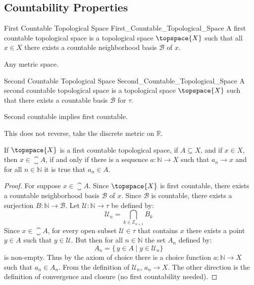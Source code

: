 \subsection{Countability Properties}
    \begin{fdefinition}{First Countable Topological Space}
                       {First_Countable_Topological_Space}
        A first countable topological space is a topological space
        $\topspace{X}$ such that all $x\in{X}$ there exists a countable
        neighborhood basis $\mathcal{B}$ of $x$.
    \end{fdefinition}
    \begin{example}
        Any metric space.
    \end{example}
    \begin{fdefinition}{Second Countable Topological Space}
                       {Second_Countable_Topological_Space}
        A second countable topological space is a topological space
        $\topspace{X}$ such that there exists a countable basis
        $\mathcal{B}$ for $\tau$.
    \end{fdefinition}
    \begin{theorem}
        Second countable implies first countable.
    \end{theorem}
    \begin{example}
        This does not reverse, take the discrete metric on $\mathbb{R}$.
    \end{example}
    \begin{theorem}
        If $\topspace{X}$ is a first countable topological space, if
        $A\subseteq{X}$, and if $x\in{X}$, then $x\in\closure{A}$, if and
        only if there is a sequence $a:\mathbb{N}\rightarrow{X}$ such that
        $a_{n}\rightarrow{x}$ and for all $n\in\mathbb{N}$ it is true that
        $a_{n}\in{A}$.
    \end{theorem}
    \begin{proof}
        For suppose $x\in\closure{A}$. Since $\topspace{X}$ is first
        countable, there exists a countable neighborhood basis $\mathcal{B}$
        of $x$. Since $\mathcal{B}$ is countable, there exists a surjection
        $B:\mathbb{N}\rightarrow\mathcal{B}$. Let
        $\mathcal{U}:\mathbb{N}\rightarrow\tau$ be defined by:
        \begin{equation}
            \mathcal{U}_{n}=\bigcap_{k\in\mathbb{Z}_{n+1}}B_{k}
        \end{equation}
        Since $x\in\closure{A}$, for every open subset $\mathcal{U}\in\tau$
        that contains $x$ there exists a point $y\in{A}$ such that
        $y\in\mathcal{U}$. But then for all $n\in\mathbb{N}$ the set
        $A_{n}$ defined by:
        \begin{equation}
            A_{n}=\{\,y\in{A}\;|\;y\in\mathcal{U}_{n}\}
        \end{equation}
        is non-empty. Thus by the axiom of choice there is a choice function
        $a:\mathbb{N}\rightarrow{X}$ such that $a_{n}\in{A}_{n}$. From the
        definition of $\mathcal{U}_{n}$, $a_{n}\rightarrow{X}$. The other
        direction is the definition of convergence and closure
        (no first countability needed).
    \end{proof}
